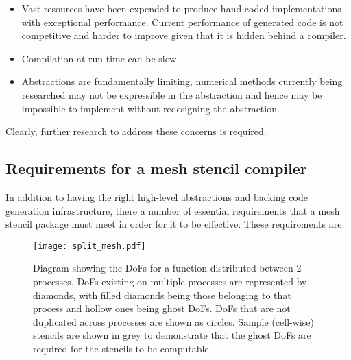 \documentclass[thesis]{subfiles}
\begin{document}
\begin{itemize}
  \item
    Vast resources have been expended to produce hand-coded implementations with exceptional performance.
    Current performance of generated code is not competitive and harder to improve given that it is hidden behind a compiler.
  \item
    Compilation at run-time can be slow.
  \item
    Abstractions are fundamentally limiting, numerical methods currently being researched may not be expressible in the abstraction and hence may be impossible to implement without redesigning the abstraction.
\end{itemize}

Clearly, further research to address these concerns is required.


\subsection{Requirements for a mesh stencil compiler}


In addition to having the right high-level abstractions and backing code generation infrastructure, there a number of essential requirements that a mesh stencil package must meet in order for it to be effective.
These requirements are:

\begin{figure}
  \centering
  \texttt{[image: split\_mesh.pdf]}
  \caption{
    Diagram showing the DoFs for a function distributed between 2 processes.
    DoFs existing on multiple processes are represented by diamonds, with filled diamonds being those belonging to that process and hollow ones being ghost DoFs.
    DoFs that are not duplicated across processes are shown as circles.
    Sample (cell-wise) stencils are shown in grey to demonstrate that the ghost DoFs are required for the stencils to be computable.
  }
  \label{fig:pyop2_split_mesh}
\end{figure}
\end{document}
